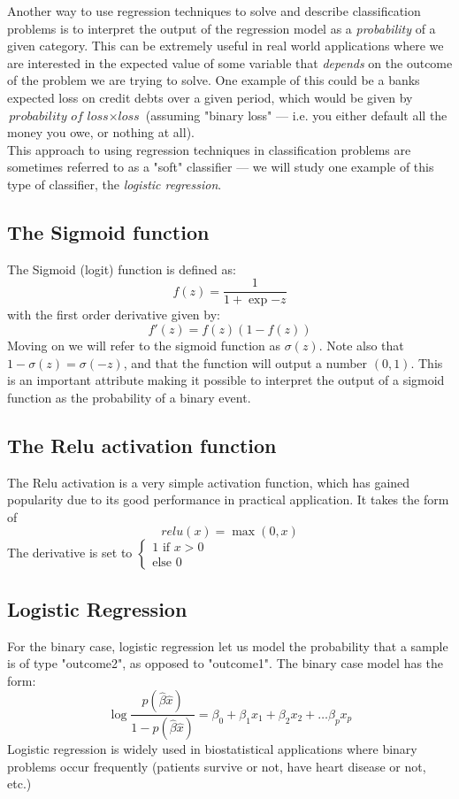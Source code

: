 \documentclass[10pt, a4paper, twocolumn]{article}
\begin{document}
		Another way to use regression techniques to solve and describe classification problems is to interpret the output of the regression model as a \emph{probability} of a given category. This can be extremely useful in real world applications where we are interested in the expected value of some variable that \emph{depends} on the outcome of the problem we are trying to solve. One example of this could be a banks expected loss on credit debts over a given period, which would be given by $\textit{probability of loss}\times\textit{loss}$ (assuming "binary loss" --- i.e. you either default all the money you owe, or nothing at all).\\
		This approach to using regression techniques in classification problems are sometimes referred to as a "soft" classifier --- we will study one example of this type of classifier, the \emph{logistic regression}. 
		
	\subsection{The Sigmoid function}
		The Sigmoid (logit) function is defined as:
			$$f(z) = \frac{1}{1+\exp{-z}}$$
		with the first order derivative given by:
			$$f'(z)=f(z)(1-f(z))$$
		Moving on we will refer to the sigmoid function as $\sigma (z)$. Note also that $1-\sigma(z)=\sigma(-z)$, and that the function will output a number $(0,1)$.
		This is an important attribute making it possible to interpret the output of a sigmoid function as the probability of a binary event.
		
	\subsection{The Relu activation function}
		The Relu activation is a very simple activation function, which has gained popularity due to its good performance in practical application. It takes the form of 
			$$relu(x) = \max(0,x)$$
		The derivative is set to $\begin{cases}
		1\text{ if }x>0\\
		\text{else }0
		\end{cases}$
		
	\subsection{Logistic Regression}
		For the binary case, logistic regression let us model the probability that a sample is of type "outcome2", as opposed to "outcome1". The binary case model has the form:
		$$\log{\frac{p(\hat{\beta}\hat{x})}{1-p(\hat{\beta}\hat{x})}}=\beta_0+\beta_1 x_1+\beta_2 x_2+\dots\beta_p x_p$$
		Logistic regression is widely used in biostatistical applications where binary problems occur frequently (patients survive or not, have heart disease or not, etc.)\cite{ElementsOfStatLearning}
\end{document}
